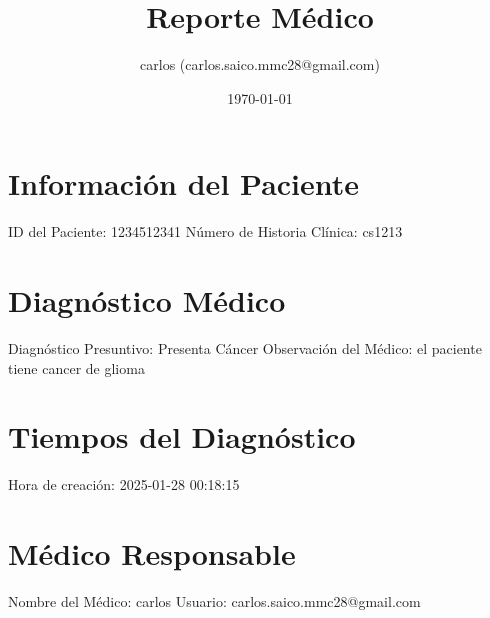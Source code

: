 \documentclass{article}%
\title{Reporte Médico}%
\author{carlos (carlos.saico.mmc28@gmail.com)}%
\date{\today}%
\begin{document}
%
\normalsize%
\maketitle%
\section{Información del Paciente}%
\label{sec:InformacindelPaciente}%
ID del Paciente: 1234512341\newline%
%
Número de Historia Clínica: cs1213\newline%

%
\section{Diagnóstico Médico}%
\label{sec:DiagnsticoMdico}%
Diagnóstico Presuntivo: Presenta Cáncer\newline%
%
Observación del Médico:\newline%
el paciente tiene cancer de glioma\newline%

%
\section{Tiempos del Diagnóstico}%
\label{sec:TiemposdelDiagnstico}%
Hora de creación: 2025{-}01{-}28 00:18:15\newline%

%
\section{Médico Responsable}%
\label{sec:MdicoResponsable}%
Nombre del Médico: carlos\newline%
%
Usuario: carlos.saico.mmc28@gmail.com\newline%

%
\end{document}
